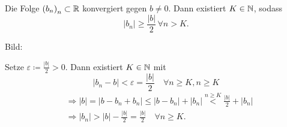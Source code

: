 \documentclass[../ana1.tex]{subfiles}
\begin{document}
\begin{lem}
	Die Folge \({(b_n)}_n \subset \mathbb{R} \) konvergiert gegen \(b\neq 0\). Dann existiert \(K\in\mathbb{N} \), sodass 
	\[|b_n| \geq \frac{|b|}{2} \,\forall n > K .\]
\end{lem}
\begin{bew}
	Bild:\\
	\begin{center}
	\end{center}
	Setze \(\varepsilon \coloneqq \frac{|b|}{2}>0\). Dann existiert \(K\in\mathbb{N} \) mit 
	\[|b_n-b| < \varepsilon = \frac{|b|}{2} \quad\forall n\geq K, n\geq K\]
	\begin{align*}
		&\Rightarrow |b| = |b-b_n + b_n| \leq |b-b_n| + |b_n| \overset{n\geq K}{<} \frac{|b|}{2} + |b_n|\\
		&\Rightarrow |b_n| > |b| - \frac{|b|}{2} = \frac{|b|}{2} \quad \forall n\geq K.
	\end{align*}
\end{bew}
\end{document}
